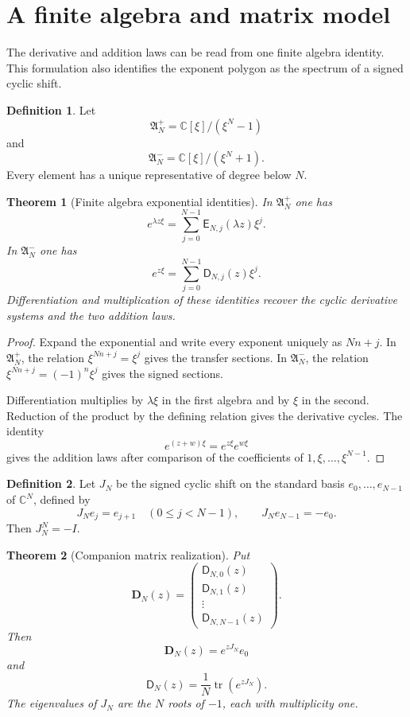 \documentclass{aomart}
\newtheorem{theorem}{Theorem}[section]
\theoremstyle{definition}
\newtheorem{definition}[definition]{Definition}
\theoremstyle{remark}
\newcommand{\CC}{\mathbb C}
\newcommand{\Dfun}{\mathsf D}
\newcommand{\Efun}{\mathsf E}
\newcommand{\tr}{\operatorname{tr}}
\begin{document}
\section{A finite algebra and matrix model}\label{sec:finite_algebra}

The derivative and addition laws can be read from one finite algebra identity.  This formulation also identifies the exponent polygon as the spectrum of a signed cyclic shift.

\begin{definition}\label{def:cyclic_algebras}
Let
\[
\mathfrak A_N^+=\CC[\xi]/(\xi^N-1)
\]
and
\[
\mathfrak A_N^-=\CC[\xi]/(\xi^N+1).
\]
Every element has a unique representative of degree below $N$.
\end{definition}

\begin{theorem}[Finite algebra exponential identities]\label{thm:finite_algebra_exponentials}
In $\mathfrak A_N^+$ one has
\[
e^{\lambda z\xi}
=
\sum_{j=0}^{N-1}\Efun_{N,j}(\lambda z)\xi^j.
\]
In $\mathfrak A_N^-$ one has
\[
e^{z\xi}
=
\sum_{j=0}^{N-1}\Dfun_{N,j}(z)\xi^j.
\]
Differentiation and multiplication of these identities recover the cyclic derivative systems and the two addition laws.
\end{theorem}

\begin{proof}
Expand the exponential and write every exponent uniquely as $Nn+j$.  In $\mathfrak A_N^+$, the relation $\xi^{Nn+j}=\xi^j$ gives the transfer sections.  In $\mathfrak A_N^-$, the relation $\xi^{Nn+j}=(-1)^n\xi^j$ gives the signed sections.

Differentiation multiplies by $\lambda\xi$ in the first algebra and by $\xi$ in the second.  Reduction of the product by the defining relation gives the derivative cycles.  The identity
\[
e^{(z+w)\xi}=e^{z\xi}e^{w\xi}
\]
gives the addition laws after comparison of the coefficients of $1,\xi,\ldots,\xi^{N-1}$.
\end{proof}

\begin{definition}\label{def:signed_shift_matrix}
Let $J_N$ be the signed cyclic shift on the standard basis $e_0,\ldots,e_{N-1}$ of $\CC^N$, defined by
\[
J_Ne_j=e_{j+1}
\quad (0\leq j<N-1),
\qquad
J_Ne_{N-1}=-e_0.
\]
Then $J_N^N=-I$.
\end{definition}

\begin{theorem}[Companion matrix realization]\label{thm:companion_matrix_realization}
Put
\[
\mathbf D_N(z)
=
\begin{pmatrix}
\Dfun_{N,0}(z)\\
\Dfun_{N,1}(z)\\
\vdots\\
\Dfun_{N,N-1}(z)
\end{pmatrix}.
\]
Then
\[
\mathbf D_N(z)=e^{zJ_N}e_0
\]
and
\[
\Dfun_N(z)=\frac1N\tr(e^{zJ_N}).
\]
The eigenvalues of $J_N$ are the $N$ roots of $-1$, each with multiplicity one.
\end{theorem}
\end{document}
